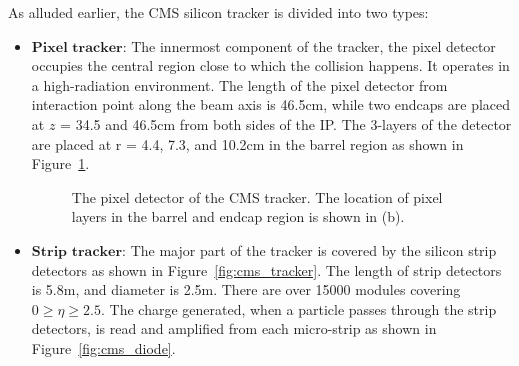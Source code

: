 As alluded earlier, the CMS silicon tracker is divided into two types:
\begin{itemize}[leftmargin=*]		
\item $\textbf{Pixel tracker}$:
	The innermost component of the tracker, the pixel detector occupies the central 
	region close to which the collision happens. It operates in a 
	high-radiation environment. The length of the pixel detector from 
	interaction point along the beam axis is 46.5\unit{cm}, while two endcaps are placed 
	at $z$ = 34.5 and 46.5\unit{cm} from both sides of the IP. The 3-layers of the detector
	are placed at r = 4.4, 7.3, and 10.2\unit{cm} in the barrel region as shown in 
	Figure~\ref{fig:cms_pixel}. 
	\begin{figure}
	  \centering
	  \hfil
	  \caption{The pixel detector of the CMS tracker. The location of pixel layers 
		in the barrel and endcap region is shown in (b).}
	  \label{fig:cms_pixel}
	\end{figure}
\item $\textbf{Strip tracker}$:
	The major part of the tracker is covered by the silicon strip detectors 
	as shown in Figure~\ref{fig:cms_tracker}. The length of strip detectors
	is 5.8\unit{m}, and diameter is 2.5\unit{m}. There are over 15000 modules covering 
	$0 \geq \eta \geq 2.5$. The charge generated, when a particle passes 
	through the strip detectors, is read and amplified from each micro-strip 
	as shown in Figure~\ref{fig:cms_diode}. 
\end{itemize}

